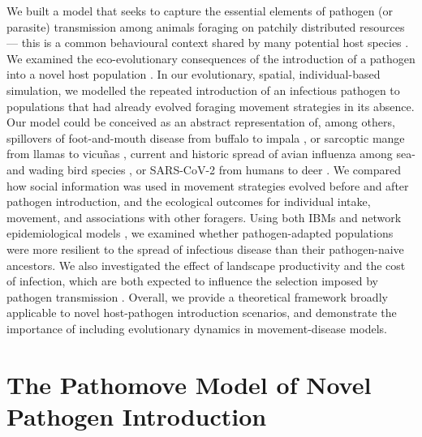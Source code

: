 We built a model that seeks to capture the essential elements of pathogen (or parasite) transmission among animals foraging on patchily distributed resources --- this is a common behavioural context shared by many potential host species \autocite{white2018a,white2018}.
We examined the eco-evolutionary consequences of the introduction of a pathogen into a novel host population \autocite[such as during cross-species spillover][]{blehert2009,bastos2000,wille2022,fereidouni2019,scheele2019,sanderson2020,carlson2022a,kuchipudi2022,monk2022}.
In our evolutionary, spatial, individual-based simulation, we modelled the repeated introduction of an infectious pathogen to populations that had already evolved foraging movement strategies in its absence.
Our model could be conceived as an abstract representation of, among others, spillovers of foot-and-mouth disease from buffalo to impala \autocite{bastos2000,vosloo2009}, or sarcoptic mange from llamas to vicu\~nas \autocite{monk2022}, current and historic spread of avian influenza among sea- and wading bird species \autocite{globconsorth5n82016,wille2022}, or SARS-CoV-2 from humans to deer \autocite{chandler2021,kuchipudi2022}.
We compared how social information was used in movement strategies evolved before and after pathogen introduction, and the ecological outcomes for individual intake, movement, and associations with other foragers.
Using both IBMs and network epidemiological models \autocite{wilber2022,stroeymeyt2018,white2017,bailey1975}, we examined whether pathogen-adapted populations were more resilient to the spread of infectious disease than their pathogen-naive ancestors.
We also investigated the effect of landscape productivity and the cost of infection, which are both expected to influence the selection imposed by pathogen transmission \autocite{ezenwa2016,almberg2015,hutchings2000}.
Overall, we provide a theoretical framework broadly applicable to novel host-pathogen introduction scenarios, and demonstrate the importance of including evolutionary dynamics in movement-disease models.

\section*{The Pathomove Model of Novel Pathogen Introduction}

